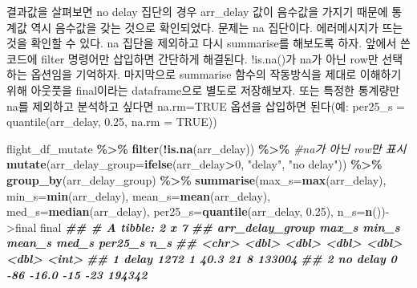 \documentclass[
]{book}
\newenvironment{Shaded}{\begin{snugshade}}{\end{snugshade}}
\newcommand{\AttributeTok}[1]{\textcolor[rgb]{0.13,0.29,0.53}{#1}}
\newcommand{\CommentTok}[1]{\textcolor[rgb]{0.56,0.35,0.01}{\textit{#1}}}
\newcommand{\DecValTok}[1]{\textcolor[rgb]{0.00,0.00,0.81}{#1}}
\newcommand{\DocumentationTok}[1]{\textcolor[rgb]{0.56,0.35,0.01}{\textbf{\textit{#1}}}}
\newcommand{\FloatTok}[1]{\textcolor[rgb]{0.00,0.00,0.81}{#1}}
\newcommand{\FunctionTok}[1]{\textcolor[rgb]{0.13,0.29,0.53}{\textbf{#1}}}
\newcommand{\NormalTok}[1]{#1}
\newcommand{\OtherTok}[1]{\textcolor[rgb]{0.56,0.35,0.01}{#1}}
\newcommand{\SpecialCharTok}[1]{\textcolor[rgb]{0.81,0.36,0.00}{\textbf{#1}}}
\newcommand{\StringTok}[1]{\textcolor[rgb]{0.31,0.60,0.02}{#1}}
\begin{document}
결과값을 살펴보면 no delay 집단의 경우 arr\_delay 값이 음수값을 가지기 때문에 통계값 역시 음수값을 갖는 것으로 확인되었다. 문제는 na 집단이다. 에러메시지가 뜨는 것을 확인할 수 있다. na 집단을 제외하고 다시 summarise를 해보도록 하자. 앞에서 쓴 코드에 filter 명령어만 삽입하면 간단하게 해결된다. !is.na()가 na가 아닌 row만 선택하는 옵션임을 기억하자. 마지막으로 summarise 함수의 작동방식을 제대로 이해하기 위해 아웃풋을 final이라는 dataframe으로 별도로 저장해보자. 또는 특정한 통계량만 na를 제외하고 분석하고 싶다면 na.rm=TRUE 옵션을 삽입하면 된다(예: per25\_s = quantile(arr\_delay, 0.25, na.rm = TRUE))

\begin{Shaded}
\begin{Highlighting}[]
\NormalTok{flight\_df\_mutate }\SpecialCharTok{\%\textgreater{}\%}
  \FunctionTok{filter}\NormalTok{(}\SpecialCharTok{!}\FunctionTok{is.na}\NormalTok{(arr\_delay)) }\SpecialCharTok{\%\textgreater{}\%}  \CommentTok{\#na가 아닌 row만 표시}
  \FunctionTok{mutate}\NormalTok{(}\AttributeTok{arr\_delay\_group=}\FunctionTok{ifelse}\NormalTok{(arr\_delay}\SpecialCharTok{\textgreater{}}\DecValTok{0}\NormalTok{, }\StringTok{"delay"}\NormalTok{, }\StringTok{"no delay"}\NormalTok{)) }\SpecialCharTok{\%\textgreater{}\%} 
  \FunctionTok{group\_by}\NormalTok{(arr\_delay\_group) }\SpecialCharTok{\%\textgreater{}\%} 
  \FunctionTok{summarise}\NormalTok{(}\AttributeTok{max\_s=}\FunctionTok{max}\NormalTok{(arr\_delay),}
            \AttributeTok{min\_s=}\FunctionTok{min}\NormalTok{(arr\_delay), }
            \AttributeTok{mean\_s=}\FunctionTok{mean}\NormalTok{(arr\_delay), }
            \AttributeTok{med\_s=}\FunctionTok{median}\NormalTok{(arr\_delay), }
            \AttributeTok{per25\_s=}\FunctionTok{quantile}\NormalTok{(arr\_delay, }\FloatTok{0.25}\NormalTok{),}
            \AttributeTok{n\_s=}\FunctionTok{n}\NormalTok{())}\OtherTok{{-}\textgreater{}}\NormalTok{final}
\NormalTok{final}
\DocumentationTok{\#\# \# A tibble: 2 x 7}
\DocumentationTok{\#\#   arr\_delay\_group max\_s min\_s mean\_s med\_s per25\_s    n\_s}
\DocumentationTok{\#\#   \textless{}chr\textgreater{}           \textless{}dbl\textgreater{} \textless{}dbl\textgreater{}  \textless{}dbl\textgreater{} \textless{}dbl\textgreater{}   \textless{}dbl\textgreater{}  \textless{}int\textgreater{}}
\DocumentationTok{\#\# 1 delay            1272     1   40.3    21       8 133004}
\DocumentationTok{\#\# 2 no delay            0   {-}86  {-}16.0   {-}15     {-}23 194342}
\end{Highlighting}
\end{Shaded}
\end{document}
